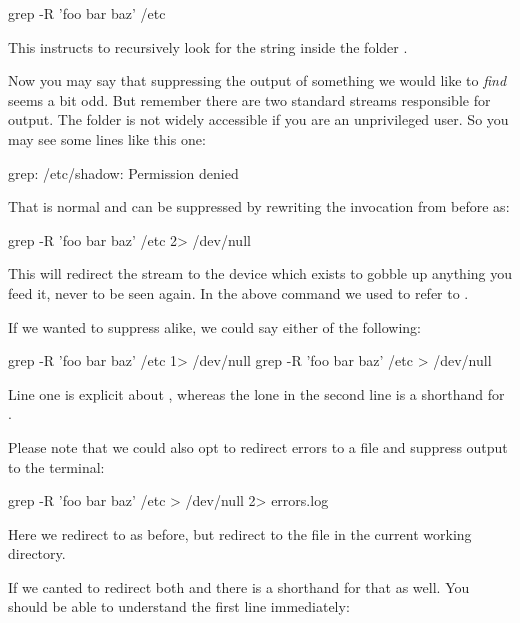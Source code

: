 \documentclass{olli-handout}
\begin{document}
\begin{lstbash}
grep -R 'foo bar baz' /etc
\end{lstbash}

This instructs  to recursively look for the string  inside the folder .

Now you may say that suppressing the output of something we would like to \emph{find} seems a bit odd. But remember there are two standard streams responsible for output. The  folder is not widely accessible if you are an unprivileged user. So you may see some lines like this one:

\begin{GenericListing}
grep: /etc/shadow: Permission denied
\end{GenericListing}

That is normal and can be suppressed by rewriting the invocation from before as:

\begin{lstbash}
grep -R 'foo bar baz' /etc 2> /dev/null
\end{lstbash}

This will redirect the  stream to the device  which exists to gobble up anything you feed it, never to be seen again. In the above command we used  to refer to .

If we wanted to suppress  alike, we could say either of the following:

\begin{lstbash}
grep -R 'foo bar baz' /etc 1> /dev/null
grep -R 'foo bar baz' /etc > /dev/null
\end{lstbash}

Line one is explicit about , whereas the lone \TTQ{>} in the second line is a shorthand for .

Please note that we could also opt to redirect errors to a file and suppress output to the terminal:

\begin{lstbash}
grep -R 'foo bar baz' /etc > /dev/null 2> errors.log
\end{lstbash}

Here we redirect  to  as before, but redirect  to the file  in the current working directory.

If we canted to redirect both  and  there is a shorthand for that as well. You should be able to understand the first line immediately:
\end{document}
